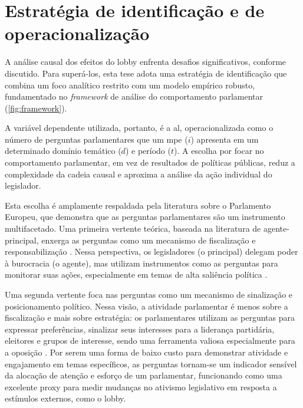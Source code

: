\section{Estratégia de identificação e de operacionalização}
\label{section:identificacao}

A análise causal dos efeitos do lobby enfrenta desafios significativos, conforme discutido. Para superá-los, esta tese adota uma estratégia de identificação que combina um foco analítico restrito com um modelo empírico robusto, fundamentado no \textit{framework} de análise do comportamento parlamentar (\ref{fig:framework}).

A variável dependente utilizada, portanto, é a \acrfull{al}, operacionalizada como o número de perguntas parlamentares que um \acrshort{mpe} ($i$) apresenta em um determinado domínio temático ($d$) e período ($t$). A escolha por focar no comportamento parlamentar, em vez de resultados de políticas públicas, reduz a complexidade da cadeia causal e aproxima a análise da ação individual do legislador.

Esta escolha é amplamente respaldada pela literatura sobre o Parlamento Europeu, que demonstra que as perguntas parlamentares são um instrumento multifacetado. Uma primeira vertente teórica, baseada na literatura de agente-principal, enxerga as perguntas como um mecanismo de fiscalização e responsabilização \cite{jensen2013parliamentary, maricut2020qa, martin2013parliamentary}. Nessa perspectiva, os legisladores (o principal) delegam poder à burocracia (o agente), mas utilizam instrumentos como as perguntas para monitorar suas ações, especialmente em temas de alta saliência política \cite{mccubbin1984congressional, saalfeld2000members, strom2000delegation, koop2011explaining}. 

Uma segunda vertente foca nas perguntas como um mecanismo de sinalização e posicionamento político. Nessa visão, a atividade parlamentar é menos sobre a fiscalização e mais sobre estratégia: os parlamentares utilizam as perguntas para expressar preferências, sinalizar seus interesses para a liderança partidária, eleitores e grupos de interesse, sendo uma ferramenta valiosa especialmente para a oposição \cite{martin2013parliamentary, otjes2017parliamentary, proksch2010parliamentary, bevan2023do, navarro2022banking}. Por serem uma forma de baixo custo para demonstrar atividade e engajamento em temas específicos, as perguntas tornam-se um indicador sensível da alocação de atenção e esforço de um parlamentar, funcionando como uma excelente proxy para medir mudanças no ativismo legislativo em resposta a estímulos externos, como o lobby.

